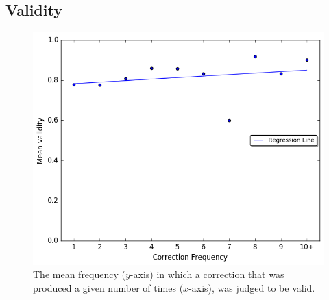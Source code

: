 \documentclass[letterpaper, 11pt]{article}
\begin{document}
\subsection{Validity}\label{ap:validity_judgements}
\begin{figure}[h!]
	\vspace{-.3cm}
	\includegraphics[width=0.9\columnwidth]{IAA_confirmation_frequency}
	\caption{The mean frequency ($y$-axis) in which a correction that was produced
		a given number of times ($x$-axis), was judged to be valid.
		\label{fig:validity_judgements}}
	\vspace{-0.3cm}
\end{figure}
\FloatBarrier
\end{document}
